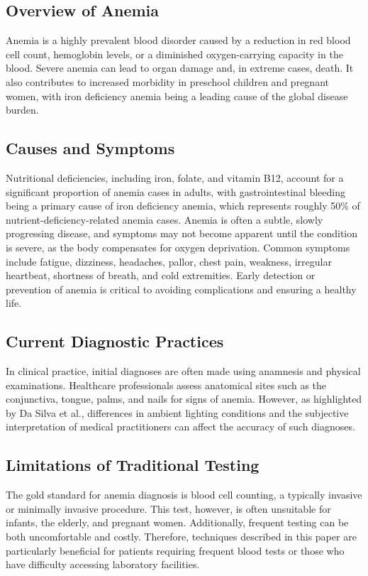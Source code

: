 \documentclass[conference]{IEEEtran}
\begin{document}
\subsection{\textbf{Overview of Anemia}}
Anemia is a highly prevalent blood disorder caused by a reduction in red blood cell count, hemoglobin levels, or a diminished oxygen-carrying capacity in the blood. Severe anemia can lead to organ damage and, in extreme cases, death. It also contributes to increased morbidity in preschool children and pregnant women, with iron deficiency anemia being a leading cause of the global disease burden.

\subsection{\textbf{Causes and Symptoms}}
Nutritional deficiencies, including iron, folate, and vitamin B12, account for a significant proportion of anemia cases in adults, with gastrointestinal bleeding being a primary cause of iron deficiency anemia, which represents roughly 50\% of nutrient-deficiency-related anemia cases. Anemia is often a subtle, slowly progressing disease, and symptoms may not become apparent until the condition is severe, as the body compensates for oxygen deprivation. Common symptoms include fatigue, dizziness, headaches, pallor, chest pain, weakness, irregular heartbeat, shortness of breath, and cold extremities. Early detection or prevention of anemia is critical to avoiding complications and ensuring a healthy life.

\subsection{\textbf{Current Diagnostic Practices}}
In clinical practice, initial diagnoses are often made using anamnesis and physical examinations. Healthcare professionals assess anatomical sites such as the conjunctiva, tongue, palms, and nails for signs of anemia. However, as highlighted by Da Silva et al., differences in ambient lighting conditions and the subjective interpretation of medical practitioners can affect the accuracy of such diagnoses.

\subsection{\textbf{Limitations of Traditional Testing}}
The gold standard for anemia diagnosis is blood cell counting, a typically invasive or minimally invasive procedure. This test, however, is often unsuitable for infants, the elderly, and pregnant women. Additionally, frequent testing can be both uncomfortable and costly. Therefore, techniques described in this paper are particularly beneficial for patients requiring frequent blood tests or those who have difficulty accessing laboratory facilities.
\end{document}
